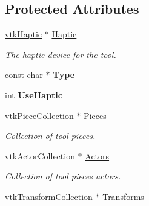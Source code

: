 \subsection*{Protected Attributes}
\begin{DoxyCompactItemize}
\item 
\hypertarget{classvtkTool_ae2af04329a7a2b42f564cd3824f26580}{
\hyperlink{classvtkHaptic}{vtkHaptic} $\ast$ \hyperlink{classvtkTool_ae2af04329a7a2b42f564cd3824f26580}{Haptic}}
\label{classvtkTool_ae2af04329a7a2b42f564cd3824f26580}

\begin{DoxyCompactList}\small\item\em The haptic device for the tool. \item\end{DoxyCompactList}\item 
\hypertarget{classvtkTool_a70eb4cd41b67e113e8f56de3577c7983}{
const char $\ast$ {\bfseries Type}}
\label{classvtkTool_a70eb4cd41b67e113e8f56de3577c7983}

\item 
\hypertarget{classvtkTool_a694917425d159b8ab997846a8a367804}{
int {\bfseries UseHaptic}}
\label{classvtkTool_a694917425d159b8ab997846a8a367804}

\item 
\hypertarget{classvtkTool_a285fe7adc43ad3d2230b26e1573f86e6}{
\hyperlink{classvtkPieceCollection}{vtkPieceCollection} $\ast$ \hyperlink{classvtkTool_a285fe7adc43ad3d2230b26e1573f86e6}{Pieces}}
\label{classvtkTool_a285fe7adc43ad3d2230b26e1573f86e6}

\begin{DoxyCompactList}\small\item\em Collection of tool pieces. \item\end{DoxyCompactList}\item 
\hypertarget{classvtkTool_a3c64ea14aa96aeb7f2667f54a0a6d3ee}{
vtkActorCollection $\ast$ \hyperlink{classvtkTool_a3c64ea14aa96aeb7f2667f54a0a6d3ee}{Actors}}
\label{classvtkTool_a3c64ea14aa96aeb7f2667f54a0a6d3ee}

\begin{DoxyCompactList}\small\item\em Collection of tool pieces actors. \item\end{DoxyCompactList}\item 
\hypertarget{classvtkTool_a806769bafe81e79da3de7f0fa5cdef18}{
vtkTransformCollection $\ast$ \hyperlink{classvtkTool_a806769bafe81e79da3de7f0fa5cdef18}{Transforms}}
\label{classvtkTool_a806769bafe81e79da3de7f0fa5cdef18}


\end{DoxyCompactItemize}
